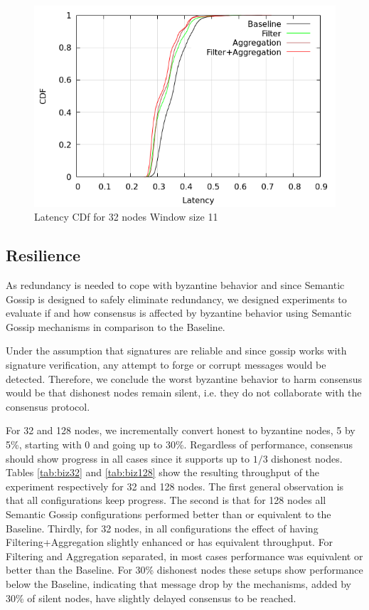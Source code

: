 \begin{figure}[htbp]
\centering
\includegraphics[width=\columnwidth]{figures/w11-32nodes-cdf.png}
\caption{Latency CDf for 32 nodes Window size 11}
\label{fig:cdfsW11}
\end{figure}

\subsection{Resilience}
\label{sec:resilience}

As redundancy is needed to cope with byzantine behavior and since Semantic Gossip is designed to safely eliminate redundancy, we designed experiments to evaluate if and how consensus is affected by byzantine behavior using Semantic Gossip mechanisms in comparison to the Baseline.

Under the assumption that signatures are reliable and since gossip works with signature verification, any attempt to forge or corrupt messages would be detected.   Therefore, we conclude the worst byzantine behavior to harm consensus would be that dishonest nodes remain silent, i.e. they do not collaborate with the consensus protocol.

For 32 and 128 nodes, we incrementally convert honest to byzantine nodes, 5 by 5\%, starting with 0 and going up to 30\%.  Regardless of performance, consensus should show progress in all cases since it supports up to $1/3$ dishonest nodes.  Tables \ref{tab:biz32} and \ref{tab:biz128} show the resulting throughput of the experiment respectively for 32 and 128 nodes.  The first general observation is that all configurations keep progress.   The second is that for 128 nodes all Semantic Gossip configurations performed better than or equivalent to the Baseline.  Thirdly, for 32 nodes, in all configurations the effect of having Filtering+Aggregation slightly enhanced or has equivalent throughput.   For Filtering and Aggregation separated, in most cases performance was equivalent or better than the Baseline.  For 30\% dishonest nodes these setups show performance below the Baseline, indicating that message drop by the mechanisms, added by 30\% of silent nodes, have slightly delayed consensus to be reached.

